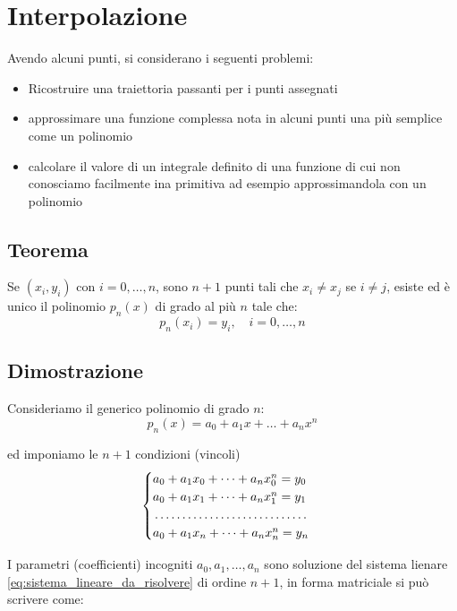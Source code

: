 \chapter{Interpolazione}
Avendo alcuni punti, si considerano i seguenti problemi:
\begin{itemize}
  \item Ricostruire una traiettoria passanti per i punti assegnati
  \item approssimare una funzione complessa nota in alcuni punti una più semplice come un polinomio
  \item calcolare il valore di un integrale definito di una funzione di cui non conosciamo facilmente ina primitiva
  ad esempio approssimandola con un polinomio
\end{itemize}

\section{Teorema}
Se $(x_i,y_i)$ con $i= 0, \dots, n$, sono $n + 1$ punti tali che $x_i \neq x_j$ se $i \neq j$, esiste
ed è unico il polinomio $p_n(x)$ di grado al più $n$ tale che:
\begin{equation}
  p_n(x_i)=y_i, \quad i = 0, \dots, n
\end{equation}

\section{Dimostrazione}
Consideriamo il generico polinomio di grado $n$:
\begin{equation}
  p_n(x) = a_0 + a_1x + \dots + a_nx^n
\end{equation}

ed imponiamo le $n + 1$ condizioni (vincoli)
\begin{equation}
  \begin{cases}
  a_0 + a_1x_0 + \dots + a_nx_0^n = y_0 \\
  a_0 + a_1x_1 + \dots + a_nx_1^n = y_1 \\

  \dotfill \\

  a_0 + a_1x_n + \dots + a_nx_n^n = y_n
  \end{cases}
  \label{eq:sistema_lineare_da_risolvere}
\end{equation}

I parametri (coefficienti) incogniti $a_0, a_1, \dots, a_n$ sono soluzione del sistema lienare \ref{eq:sistema_lineare_da_risolvere} di ordine $n + 1$, in forma matriciale
si può scrivere come:

